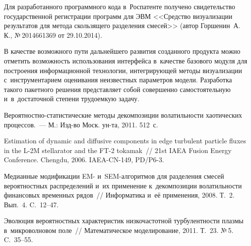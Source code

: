 \begin{multicols}{2}
Для разработанного программного кода в~Роспатенте получено свидетельство государственной регистрации
программ для ЭВМ  <<Средство визуализации результатов для метода скользящего разделения смесей>>
(автор Горшенин~А.\,К., №\,2014661369 от 29.10.2014).

В качестве возможного пути дальнейшего развития созданного продукта можно отметить возможность
использования интерфейса в~качестве базового модуля для построения информационной технологии,
интегрирующей методы визуализации с~инструментарием оценивания неизвестных параметров модели.
Разработка такого пакетного решения представляет собой совершенно самостоятельную и~в~достаточной
степени трудоемкую задачу.

{\small\frenchspacing
 {%
 \begin{thebibliography}{9}
Ве\-ро\-ят\-но\-ст\-но-ста\-ти\-сти\-че\-ские методы декомпозиции
волатильности хаотических процессов.~--- М.: Изд-во Моск. ун-та, 2011. 512~с.

Estimation of dynamic and diffusive
components in edge turbulent particle fluxes in the L-2M stellarator and the FT-2
tokamak~//
21st IAEA Fusion Energy Conference. Chengdu, 2006. IAEA-CN-149, PD/P6-3.

 
Медианные
модификации EM- и~SEM-ал\-го\-рит\-мов для разделения смесей вероятностных
распределений и~их применение к~декомпозиции волатильности финансовых временных
рядов~// Информатика и~её применения, 2008. Т.~2. Вып.~4. C.~12--47.

Эволюция вероятностных характеристик низкочастотной турбулентности плазмы
в~микроволновом поле~// Математическое моделирование, 2011. Т.~23. №\,5. C.~35--55.
 \end{thebibliography}

 }
 }

\end{multicols}

\vspace*{-9pt}

